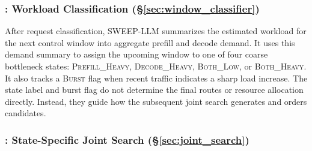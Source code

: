 \subsubsection*{\textnormal{\textbf{: Workload Classification (\S\ref{sec:window_classifier})}}}
After request classification, SWEEP-LLM summarizes the estimated workload for the next control window into aggregate prefill and decode demand.
It uses this demand summary to assign the upcoming window to one of four coarse bottleneck states: \textsc{Prefill\_Heavy}, \textsc{Decode\_Heavy}, \textsc{Both\_Low}, or \textsc{Both\_Heavy}.
It also tracks a \textsc{Burst} flag when recent traffic indicates a sharp load increase.
The state label and burst flag do not determine the final routes or resource allocation directly. 
Instead, they guide how the subsequent joint search generates and orders candidates.

\subsubsection*{\textnormal{\textbf{: State-Specific Joint Search (\S\ref{sec:joint_search})}}}

